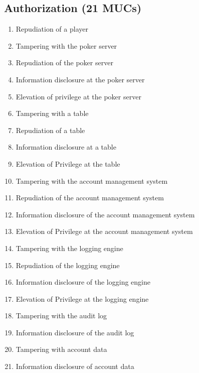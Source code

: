 \documentclass[a4paper,11pt]{report}
\begin{document}
\subsection{Authorization (21 MUCs)}
\begin{enumerate}
\item Repudiation of a player
\item Tampering with the poker server
\item Repudiation of the poker server
\item Information disclosure at the poker server
\item Elevation of privilege at the poker server
\item Tampering with a table
\item Repudiation of a table 
\item Information disclosure at a table
\item Elevation of Privilege at the table
\item Tampering with the account management system
\item Repudiation of the account management system
\item Information disclosure of the account management system
\item Elevation of Privilege at the account management system 
\item Tampering with the logging engine 
\item Repudiation of the logging engine 
\item Information disclosure of the logging engine 
\item Elevation of Privilege at the logging engine
\item Tampering with the audit log
\item Information disclosure of the audit log
\item Tampering with account data
\item Information disclosure of account data 
\end{enumerate}
\end{document}
